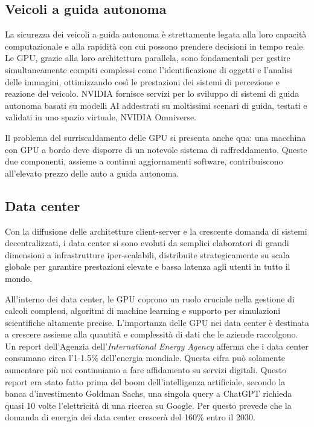 \documentclass[12pt,a4paper,oneside]{book}
\begin{document}
\subsection{Veicoli a guida autonoma}

La sicurezza dei veicoli a guida autonoma è strettamente legata alla loro capacità computazionale e alla rapidità con cui possono prendere decisioni in tempo reale. Le GPU, grazie alla loro architettura parallela, sono fondamentali per gestire simultaneamente compiti complessi come l’identificazione di oggetti e l’analisi delle immagini, ottimizzando così le prestazioni dei sistemi di percezione e reazione del veicolo. NVIDIA fornisce servizi per lo sviluppo di sistemi di guida autonoma basati su modelli AI addestrati su moltissimi scenari di guida, testati e validati in uno spazio virtuale, NVIDIA Omniverse.

Il problema del surriscaldamento delle GPU si presenta anche qua: una macchina con GPU a bordo deve disporre di un notevole sistema di raffreddamento. Queste due componenti, assieme a continui aggiornamenti software, contribuiscono all'elevato prezzo delle auto a guida autonoma.

\subsection{Data center}

Con la diffusione delle architetture client-server e la crescente domanda di sistemi decentralizzati, i data center si sono evoluti da semplici elaboratori di grandi dimensioni a infrastrutture iper-scalabili, distribuite strategicamente su scala globale per garantire prestazioni elevate e bassa latenza agli utenti in tutto il mondo.

All'interno dei data center, le GPU coprono un ruolo cruciale nella gestione di calcoli complessi, algoritmi di machine learning e supporto per simulazioni scientifiche altamente precise. L'importanza delle GPU nei data center è destinata a crescere assieme alla quantità e complessità di dati che le aziende raccolgono. Un report dell'Agenzia dell'\textit{International Energy Agency} afferma che i data center consumano circa l'1-1.5\% dell'energia mondiale. Questa cifra può solamente aumentare più noi continuiamo a fare affidamento su servizi digitali. Questo report era stato fatto prima del boom dell'intelligenza artificiale, secondo la banca d'investimento Goldman Sachs, una singola query a ChatGPT richieda quasi 10 volte l'elettricità di una ricerca su Google. Per questo prevede che la domanda di energia dei data center crescerà del 160\% entro il 2030.
\end{document}
